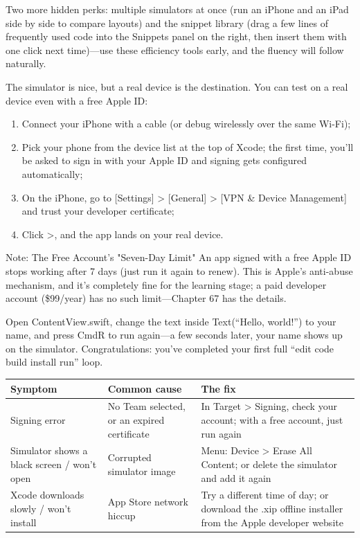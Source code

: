 Two more hidden perks: multiple simulators at once (run an iPhone and an iPad side by side to compare layouts) and the snippet library (drag a few lines of frequently used code into the Snippets panel on the right, then insert them with one click next time)—use these efficiency tools early, and the fluency will follow naturally.


The simulator is nice, but a real device is the destination. You can test on a real device even with a free Apple ID:

\begin{enumerate}
  \item Connect your iPhone with a cable (or debug wirelessly over the same Wi-Fi);
  \item Pick your phone from the device list at the top of Xcode; the first time, you'll be asked to sign in with your Apple ID and signing gets configured automatically;
  \item On the iPhone, go to [Settings] > [General] > [VPN \& Device Management] and trust your developer certificate;
  \item Click >, and the app lands on your real device.
\end{enumerate}

\begin{tcbwarn}{Note: The Free Account's "Seven-Day Limit"}
An app signed with a free Apple ID stops working after 7 days (just run it again to renew). This is Apple's anti-abuse mechanism, and it's completely fine for the learning stage; a paid developer account (\$99/year) has no such limit—Chapter 67 has the details.

\end{tcbwarn}



Open ContentView.swift, change the text inside Text(“Hello, world!”) to your name, and press CmdR to run again—a few seconds later, your name shows up on the simulator. Congratulations: you've completed your first full “edit code build install run” loop.

\begin{center}
\begin{tabularx}{\linewidth}{|X|X|X|}
\hline
\textbf{Symptom} & \textbf{Common cause} & \textbf{The fix} \tabularnewline
\hline
Signing error & No Team selected, or an expired certificate & In Target > Signing, check your account; with a free account, just run again \tabularnewline
Simulator shows a black screen / won't open & Corrupted simulator image & Menu: Device > Erase All Content; or delete the simulator and add it again \tabularnewline
Xcode downloads slowly / won't install & App Store network hiccup & Try a different time of day; or download the .xip offline installer from the Apple developer website \tabularnewline
\hline
\end{tabularx}
\end{center}

